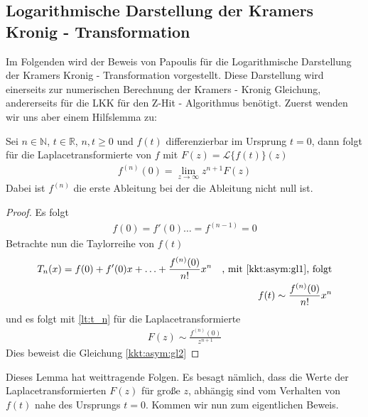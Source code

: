 \subsection{Logarithmische Darstellung der Kramers Kronig - Transformation}
Im Folgenden wird der Beweis von Papoulis \cite[Seite 207-209]{Papoulis1962} für die Logarithmische Darstellung der Kramers Kronig - Transformation vorgestellt. Diese Darstellung wird einerseits zur numerischen Berechnung der Kramers - Kronig Gleichung, andererseits für die LKK für den Z-Hit - Algorithmus benötigt. Zuerst wenden wir uns aber einem Hilfslemma zu:
\begin{lemma}\label{kkt:asym}
Sei $n \in \mathbb{N}$, $t \in \mathbb{R}$, $n, t \geq 0$ und $f(t)$ differenzierbar im Ursprung  $t = 0$, dann folgt für die Laplacetransformierte von $f$ mit $F(z) = \mathscr{L}\{f(t)\}(z)$
\begin{align}
	f^{(n)}(0) = \lim_{z \rightarrow \infty} z^{n+1} F(z) \label{kkt:asym:gl2}
\end{align}
Dabei ist $f^{(n)}$ die erste Ableitung bei der die Ableitung nicht null ist.
\begin{proof}
Es folgt
\begin{align}
	f(0) = f'(0) \hdots = f^{(n-1)} = 0 \label{kkt:asym:gl1}
\end{align}
Betrachte nun die Taylorreihe von $f(t)$
\begin{align}
	T_n(x) = f(0) + f'(0) x + \hdots + \frac{f^{(n)}(0)}{n!}x^n \quad\text{, mit \ref{kkt:asym:gl1}, folgt}\\
	f(t) \sim \frac{f^{(n)}(0)}{n!}x^n
\end{align}
und es folgt mit \ref{lt:t_n} für die Laplacetransformierte 
\begin{align}
	F(z) \sim \frac{f^{(n)}(0)}{z^{n+1}}
\end{align}
Dies beweist die Gleichung \ref{kkt:asym:gl2}
\end{proof}
\end{lemma}
Dieses Lemma hat weittragende Folgen. Es besagt nämlich, dass die Werte der Laplacetransformierten $F(z)$ für große $z$, abhängig sind vom Verhalten von $f(t)$ nahe des Ursprungs $t = 0$. Kommen wir nun zum eigentlichen Beweis.
